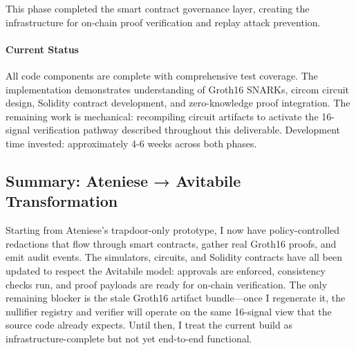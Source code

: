 This phase completed the smart contract governance layer, creating the infrastructure for on-chain proof verification and replay attack prevention.

\paragraph{Current Status}

All code components are complete with comprehensive test coverage. The implementation demonstrates understanding of Groth16 SNARKs, circom circuit design, Solidity contract development, and zero-knowledge proof integration. The remaining work is mechanical: recompiling circuit artifacts to activate the 16-signal verification pathway described throughout this deliverable. Development time invested: approximately 4-6 weeks across both phases.

\subsection{Summary: Ateniese → Avitabile Transformation}

Starting from Ateniese's trapdoor-only prototype, I now have policy-controlled redactions that flow through smart contracts, gather real Groth16 proofs, and emit audit events. The simulators, circuits, and Solidity contracts have all been updated to respect the Avitabile model: approvals are enforced, consistency checks run, and proof payloads are ready for on-chain verification. The only remaining blocker is the stale Groth16 artifact bundle—once I regenerate it, the nullifier registry and verifier will operate on the same 16-signal view that the source code already expects. Until then, I treat the current build as infrastructure-complete but not yet end-to-end functional.
